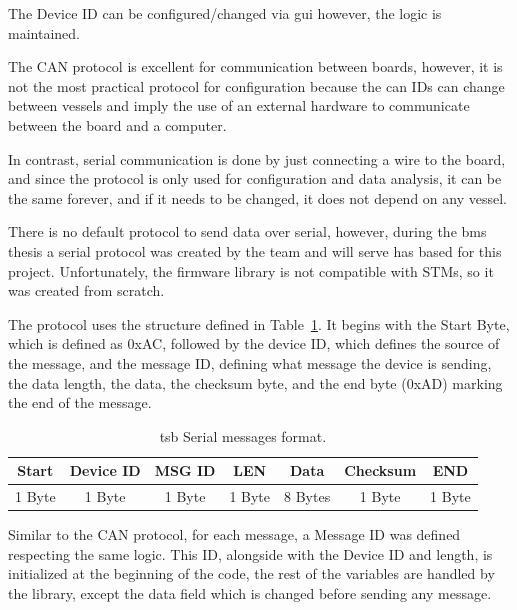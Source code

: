         The Device ID can be configured/changed via \ac{gui} however, the logic is maintained.

        The CAN protocol is excellent for communication between boards, however, it is not the most practical protocol for configuration because the \ac{can} IDs can change between vessels and imply the use of an external hardware to communicate between the board and a computer.

        In contrast, serial communication is done by just connecting a wire to the board, and since the protocol is only used for configuration and data analysis, it can be the same forever, and if it needs to be changed, it does not depend on any vessel. 

        There is no default protocol to send data over serial, however, during the \ac{bms} thesis a serial protocol was created by the team and will serve has based for this project. Unfortunately, the firmware library is not compatible with STMs, so it was created from scratch.

        The protocol uses the structure defined in Table~\ref{tab:serial_message_format}. It begins with the Start Byte, which is defined as 0xAC, followed by the device ID, which defines the source of the message, and the message ID, defining what message the device is sending, the data length, the data, the checksum byte, and the end byte (0xAD) marking the end of the message.

        \begin{table}[!h]
            \centering
            \caption{\ac{tsb} Serial messages format.}
            \label{tab:serial_message_format}
            \begin{tabular}{|c|c|c|c|c|c|c|}
                \hline
                \textbf{Start} & \textbf{Device ID} & \textbf{MSG ID} & \textbf{LEN} & \textbf{Data} & \textbf{Checksum} & \textbf{END} \\ \hline
                1 Byte & 1 Byte & 1 Byte & 1 Byte & 8 Bytes & 1 Byte & 1 Byte \\ \hline
            \end{tabular}
        \end{table}
        
        Similar to the CAN protocol, for each message, a Message ID was defined respecting the same logic. This ID, alongside with the Device ID and length, is initialized at the beginning of the code, the rest of the variables are handled by the library, except the data field which is changed before sending any message.
        
